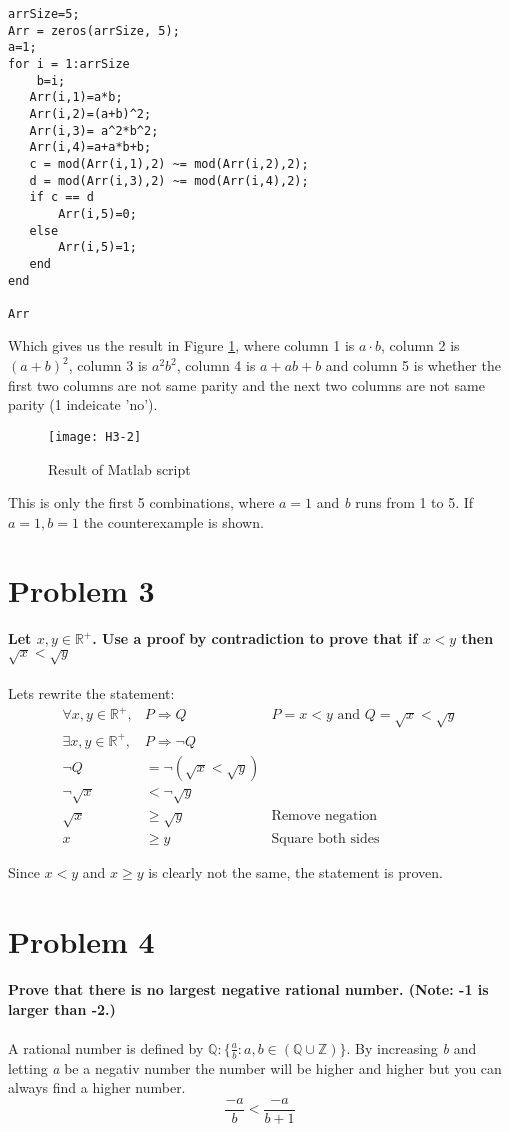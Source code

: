 \documentclass[english,10pt,a4paper]{article}
\begin{document}
\begin{lstlisting}[caption=Problem 2, style=Code-Java, label=lst:prob2]
arrSize=5;
Arr = zeros(arrSize, 5);
a=1;
for i = 1:arrSize
    b=i;
   Arr(i,1)=a*b;
   Arr(i,2)=(a+b)^2;
   Arr(i,3)= a^2*b^2;
   Arr(i,4)=a+a*b+b;
   c = mod(Arr(i,1),2) ~= mod(Arr(i,2),2);
   d = mod(Arr(i,3),2) ~= mod(Arr(i,4),2);
   if c == d
       Arr(i,5)=0;
   else
       Arr(i,5)=1;
   end
end

Arr
\end{lstlisting}
Which gives us the result in Figure \ref{fig:prob2}, where column 1 is $a\cdot b$, column 2 is $(a+b)^2$, column 3 is $a^2b^2$, column 4 is $a+ab+b$ and column 5 is whether the first two columns are not same parity and the next two columns are not same parity (1 indeicate 'no').
\begin{figure}[hbtp]
\centering
\texttt{[image: H3-2]}
\caption{Result of Matlab script}
\label{fig:prob2}
\end{figure}
This is only the first 5 combinations, where $a=1$ and \textit{b} runs from 1 to 5.
If $a=1, b=1$ the counterexample is shown.



\section*{Problem 3}
\textbf{Let $x, y \in \mathbb{R}^{+}$. Use a proof by contradiction to prove that if $x<y$ then $\sqrt{x} < \sqrt{y}$}
\\
\\
Lets rewrite the statement:
\begin{align}
\forall x, y \in \mathbb{R}^+, &P \Rightarrow Q & P = x < y \text{ and } Q = \sqrt{x}<\sqrt{y} \\
\exists x, y \in \mathbb{R}^+, &P \Rightarrow \neg Q \\
\neg Q &= \neg(\sqrt{x} < \sqrt{y})\\
\neg\sqrt{x} &< \neg \sqrt{y} \\
\sqrt{x} &\geq \sqrt{y} & \text{Remove negation}\\
x &\geq y & \text{Square both sides}
\end{align}

Since $x<y$ and $x\geq y$ is clearly not the same, the statement is proven.


\section*{Problem 4}
\textbf{Prove that there is no largest negative rational number. (Note: -1 is larger than -2.)}
\\
\\
A rational number is defined by $\mathbb{Q}: \{ \frac{a}{b}:a, b \in (\mathbb{Q} \cup \mathbb{Z})\}$.
By increasing \textit{b} and letting \textit{a} be a negativ number the number will be higher and higher but you can always find a higher number.
\[ \dfrac{-a}{b} < \dfrac{-a}{b+1}\]
\end{document}
